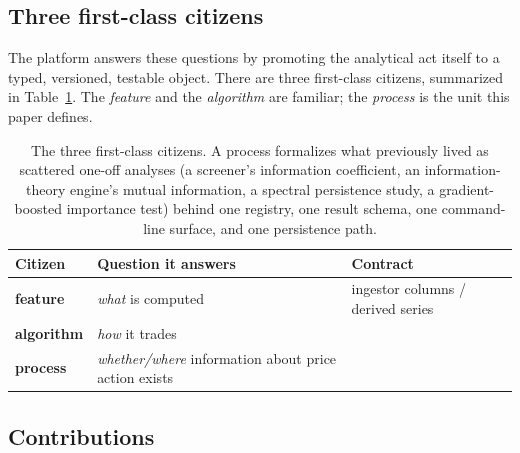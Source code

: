\documentclass[11pt,a4paper]{article}
\theoremstyle{definition}
\theoremstyle{plain}
\newcommand{\code}[1]{\texttt{\detokenize{#1}}}
\begin{document}
\subsection{Three first-class citizens}

The platform answers these questions by promoting the analytical act itself to a typed,
versioned, testable object. There are three first-class citizens, summarized in
Table~\ref{tab:citizens}. The \emph{feature} and the \emph{algorithm} are familiar; the
\emph{process} is the unit this paper defines.

\begin{table}[h]
\centering
\renewcommand{\arraystretch}{1.3}
\setlength{\tabcolsep}{6pt}
\begin{tabular}{>{\raggedright\arraybackslash}p{2.4cm}
                >{\raggedright\arraybackslash}p{6.4cm}
                >{\raggedright\arraybackslash}p{5.6cm}}
\hline
\textbf{Citizen} & \textbf{Question it answers} & \textbf{Contract} \\
\hline
\textbf{feature}   & \emph{what} is computed                                   & ingestor columns / derived series \\
\textbf{algorithm} & \emph{how} it trades                                      & \code{MicrostructureAlgorithm} \\
\textbf{process}   & \emph{whether/where} information about price action exists & \code{Process} \\
\hline
\end{tabular}
\caption{The three first-class citizens. A process formalizes what previously lived as scattered
one-off analyses (a screener's information coefficient, an information-theory engine's mutual
information, a spectral persistence study, a gradient-boosted importance test) behind one registry,
one result schema, one command-line surface, and one persistence path.}
\label{tab:citizens}
\end{table}

\subsection{Contributions}
\end{document}
